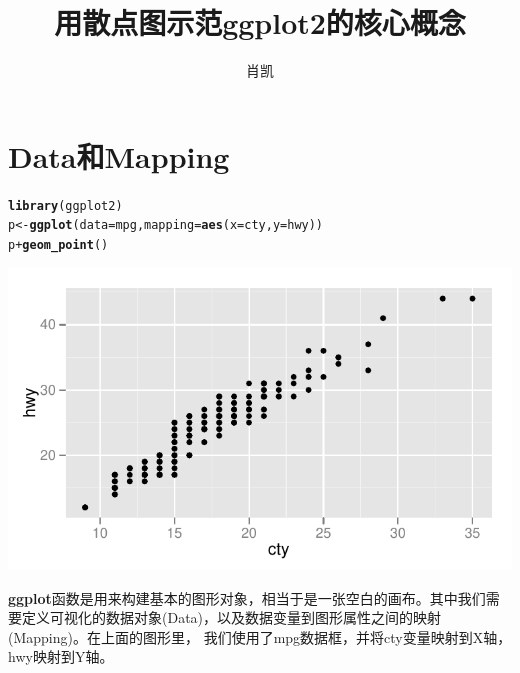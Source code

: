 \documentclass[UTF8,10pt]{ctexart}\usepackage{graphicx, color}
\makeatletter
\def\maxwidth{ %
  \ifdim\Gin@nat@width>\linewidth
    \linewidth
  \else
    \Gin@nat@width
  \fi
}
\newcommand{\hlfunctioncall}[1]{\textcolor[rgb]{0.501960784313725,0,0.329411764705882}{\textbf{#1}}}%
\newenvironment{kframe}{%
 \def\at@end@of@kframe{}%
 \ifinner\ifhmode%
  \def\at@end@of@kframe{\end{minipage}}%
  \begin{minipage}{\columnwidth}%
 \fi\fi%
 \def\FrameCommand##1{\hskip\@totalleftmargin \hskip-\fboxsep
 \colorbox{shadecolor}{##1}\hskip-\fboxsep
     \hskip-\linewidth \hskip-\@totalleftmargin \hskip\columnwidth}%
 \MakeFramed {\advance\hsize-\width
   \@totalleftmargin\z@ \linewidth\hsize
   \@setminipage}}%
 {\par\unskip\endMakeFramed%
 \at@end@of@kframe}
\newenvironment{knitrout}{}{} %
\makeatother
\begin{document}
\title{用散点图示范ggplot2的核心概念}
\author{肖凯}
\maketitle
{}
\section{Data和Mapping}
\begin{knitrout}
\color{fgcolor}\begin{kframe}
\begin{alltt}
\hlfunctioncall{library}(ggplot2)
p <- \hlfunctioncall{ggplot}(data=mpg,mapping=\hlfunctioncall{aes}(x=cty,y=hwy))
p + \hlfunctioncall{geom_point}()
\end{alltt}
\end{kframe}

{\centering \includegraphics[width=\maxwidth]{figure/unnamed-chunk-1} 

}


\end{knitrout}

\textbf{ggplot}函数是用来构建基本的图形对象，相当于是一张空白的画布。其中我们需要定义可视化的数据对象(Data)，以及数据变量到图形属性之间的映射(Mapping)。在上面的图形里， 我们使用了mpg数据框，并将cty变量映射到X轴，hwy映射到Y轴。
\end{document}

